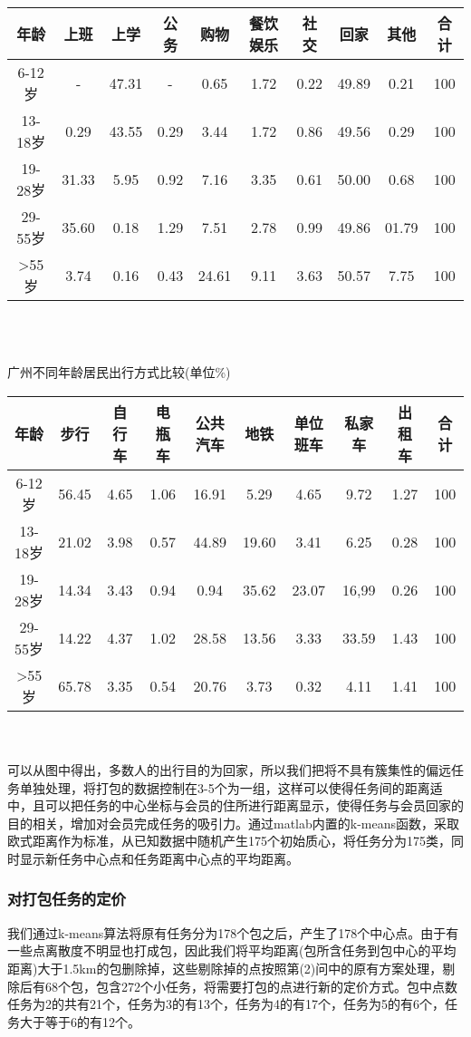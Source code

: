 \documentclass{ctexart}
\begin{document}
\begin{tabular}{|cccccccccc|}

\hline
年龄 &上班&上学&公务&购物&餐饮娱乐&社交&回家&其他&合计\\
\hline
6-12岁 &-&47.31&-&0.65&1.72&0.22&49.89&0.21&100\\
\hline
13-18岁 &0.29&43.55&0.29&3.44&1.72&0.86&49.56&0.29&100\\
\hline
19-28岁 &31.33&5.95&0.92&7.16&3.35&0.61&50.00&0.68&100\\
\hline
29-55岁 &35.60&0.18&1.29&7.51&2.78&0.99&49.86&01.79&100\\
\hline
>55岁 &3.74&0.16&0.43&24.61&9.11&3.63&50.57&7.75&100\\
\hline
\end{tabular}
\\
\\
\centerline{广州不同年龄居民出行方式比较(单位\%)}

\begin{tabular}{|cccccccccc|}

\hline
年龄 &步行&自行车&电瓶车&公共汽车&地铁&单位班车&私家车&出租车&合计\\
\hline
6-12岁 &56.45&4.65&1.06&16.91&5.29&4.65&9.72&1.27&100\\
\hline
13-18岁 &21.02&3.98&0.57&44.89&19.60&3.41&6.25&0.28&100\\
\hline
19-28岁 &14.34&3.43&0.94&0.94&35.62&23.07&16,99&0.26&100\\
\hline
29-55岁 &14.22&4.37&1.02&28.58&13.56&3.33&33.59&1.43&100\\
\hline
>55岁 &65.78&3.35&0.54&20.76&3.73&0.32&4.11&1.41&100\\
\hline
\end{tabular}
\\
\\
可以从图中得出，多数人的出行目的为回家，所以我们把将不具有簇集性的偏远任务单独处理，将打包的数据控制在3-5个为一组，这样可以使得任务间的距离适中，且可以把任务的中心坐标与会员的住所进行距离显示，使得任务与会员回家的目的相关，增加对会员完成任务的吸引力。通过matlab内置的k-means函数，采取欧式距离作为标准，从已知数据中随机产生175个初始质心，将任务分为175类，同时显示新任务中心点和任务距离中心点的平均距离。
\subsubsection{对打包任务的定价}
我们通过k-means算法将原有任务分为178个包之后，产生了178个中心点。由于有一些点离散度不明显也打成包，因此我们将平均距离(包所含任务到包中心的平均距离)大于1.5km的包删除掉，这些剔除掉的点按照第(2)问中的原有方案处理，剔除后有68个包，包含272个小任务，将需要打包的点进行新的定价方式。包中点数任务为2的共有21个，任务为3的有13个，任务为4的有17个，任务为5的有6个，任务大于等于6的有12个。
\end{document}
